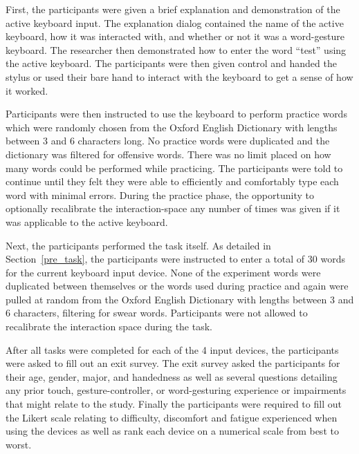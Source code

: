 First, the participants were given a brief explanation and demonstration of the active keyboard input. The explanation dialog contained the name of the active keyboard, how it was interacted with, and whether or not it was a word-gesture keyboard. The researcher then demonstrated how to enter the word ``test'' using the active keyboard. The participants were then given control and handed the stylus or used their bare hand to interact with the keyboard to get a sense of how it worked.

Participants were then instructed to use the keyboard to perform practice words which were randomly chosen from the Oxford English Dictionary with lengths between 3 and 6 characters long. No practice words were duplicated and the dictionary was filtered for offensive words. There was no limit placed on how many words could be performed while practicing. The participants were told to continue until they felt they were able to efficiently and comfortably type each word with minimal errors. During the practice phase, the opportunity to optionally recalibrate the interaction-space any number of times was given if it was applicable to the active keyboard.

Next, the participants performed the task itself. As detailed in Section~\ref{pre_task}, the participants were instructed to enter a total of 30 words for the current keyboard input device. None of the experiment words were duplicated between themselves or the words used during practice and again were pulled at random from the Oxford English Dictionary with lengths between 3 and 6 characters, filtering for swear words. Participants were not allowed to recalibrate the interaction space during the task. 

After all tasks were completed for each of the 4 input devices, the participants were asked to fill out an exit survey. The exit survey asked the participants for their age, gender, major, and handedness as well as several questions detailing any prior touch, gesture-controller, or word-gesturing experience or impairments that might relate to the study. Finally the participants were required to fill out the Likert scale relating to difficulty, discomfort and fatigue experienced when using the devices as well as rank each device on a numerical scale from best to worst.
	
